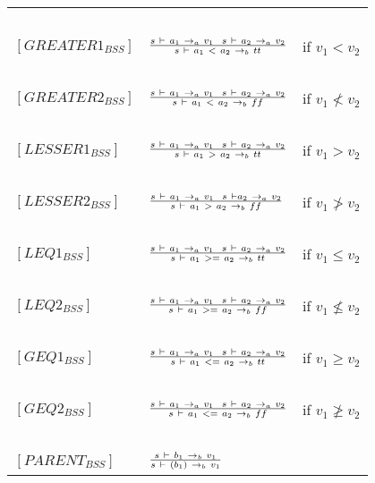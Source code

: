 \begin{table}[H]
\begin{tabular}{|l|l|l|}
			~			&															~																			& ~ \\
	$[GREATER1_{BSS}]$	& $s~\vdash~a_{1}~\rightarrow_{a}~v_{1}~~s~
	\vdash~a_{2}~\rightarrow_{a}~v_{2} \over s~\vdash~a_{1}~<~a_{2}~\rightarrow_{b}~tt$			& if $v_{1} < v_{2}$ \\
			~			&															~																			& ~ \\
	$[GREATER2_{BSS}]$	& $s~\vdash~a_{1}~\rightarrow_{a}~v_{1}~~s~
	\vdash~a_{2}~\rightarrow_{a}~v_{2} \over s~\vdash~a_{1}~<~a_{2}~\rightarrow_{b}~ff$			& if $v_{1} \not< v_{2}$ \\
			~			&															~																			& ~ \\
	$[LESSER1_{BSS}]$	& $s~\vdash~a_{1}~\rightarrow_{a}~v_{1}~~s~\vdash~a_{2}~
	\rightarrow_{a}~v_{2} \over s~\vdash~a_{1}~>~a_{2}~\rightarrow_{b}~tt$			& if $v_{1} > v_{2}$ \\
			~			&															~																			& ~ \\
	$[LESSER2_{BSS}]$	& $s~\vdash~a_{1}~\rightarrow_{a}~v_{1}~~s~\vdash a_{2}~\rightarrow_{a}~v_{2} \over s~\vdash~a_{1}~>~a_{2}~\rightarrow_{b}~ff$			& if $v_{1} \not> v_{2}$ \\
			~			&															~																			& ~ \\
	$[LEQ1_{BSS}]$		& $s~\vdash~a_{1}~\rightarrow_{a}~v_{1}~~s~\vdash~a_{2}~
	\rightarrow_{a}~v_{2} \over s~\vdash~a_{1}~>=~a_{2}~\rightarrow_{b}~tt$			& if $v_{1} \leq v_{2}$ \\
			~			&															~																			& ~ \\
	$[LEQ2_{BSS}]$		& $s~\vdash~a_{1}~\rightarrow_{a}~v_{1}~~s~\vdash~a_{2}~
	\rightarrow_{a}~v_{2} \over s~\vdash~a_{1}~>=~a_{2}~\rightarrow_{b}~ff$			& if $v_{1} \not\leq v_{2}$ \\
			~			&															~																			& ~ \\
	$[GEQ1_{BSS}]$		& $s~\vdash~a_{1}~\rightarrow_{a}~v_{1}~~s~\vdash~a_{2}~
	\rightarrow_{a}~v_{2} \over s~\vdash~a_{1}~<=~a_{2}~\rightarrow_{b}~tt$			& if $v_{1} \geq v_{2}$ \\
			~			&															~																			& ~ \\
	$[GEQ2_{BSS}]$		& $s~\vdash~a_{1}~\rightarrow_{a}~v_{1}~~s~\vdash~a_{2}~
	\rightarrow_{a}~v_{2} \over s~\vdash~a_{1}~<=~a_{2}~\rightarrow_{b}~ff$			& if $v_{1} \not\geq v_{2}$ \\
			~			&															~																			& ~ \\
	$[PARENT_{BSS}]$	& $s~\vdash~b_{1}~\rightarrow_{b}~v_{1} \over s~\vdash~(b_{1})~\rightarrow_{b}~v_{1}$													& ~ \\

\end{tabular}
\end{table}
